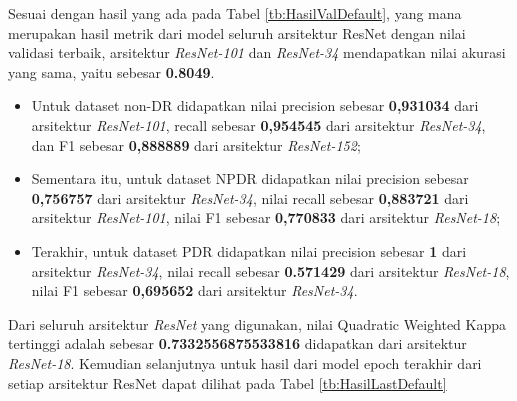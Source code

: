 Sesuai dengan hasil yang ada pada Tabel \ref{tb:HasilValDefault}, yang mana merupakan hasil metrik dari model seluruh arsitektur ResNet dengan nilai validasi terbaik, arsitektur \emph{ResNet-101} dan \emph{ResNet-34} mendapatkan nilai akurasi yang sama, yaitu sebesar \textbf{0.8049}.

\begin{itemize}
	
	\item Untuk dataset non-DR didapatkan nilai precision sebesar \textbf{0,931034} dari arsitektur \emph{ResNet-101}, recall sebesar \textbf{0,954545} dari arsitektur \emph{ResNet-34}, dan F1 sebesar \textbf{0,888889} dari arsitektur \emph{ResNet-152};
	
	\item Sementara itu, untuk dataset NPDR didapatkan nilai precision sebesar \textbf{0,756757} dari arsitektur \emph{ResNet-34}, nilai recall sebesar \textbf{0,883721} dari arsitektur \emph{ResNet-101}, nilai F1 sebesar \textbf{0,770833} dari arsitektur \emph{ResNet-18};
	
	\item Terakhir, untuk dataset PDR didapatkan nilai precision sebesar \textbf{1} dari arsitektur \emph{ResNet-34}, nilai recall sebesar \textbf{0.571429} dari arsitektur \emph{ResNet-18}, nilai F1 sebesar \textbf{0,695652} dari arsitektur \emph{ResNet-34}.
	
\end{itemize}

Dari seluruh arsitektur \emph{ResNet} yang digunakan, nilai Quadratic Weighted Kappa tertinggi adalah sebesar \textbf{0.7332556875533816} didapatkan dari arsitektur \emph{ResNet-18}. Kemudian selanjutnya untuk hasil dari model epoch terakhir dari setiap arsitektur ResNet dapat dilihat pada Tabel \ref{tb:HasilLastDefault}
\pagebreak

